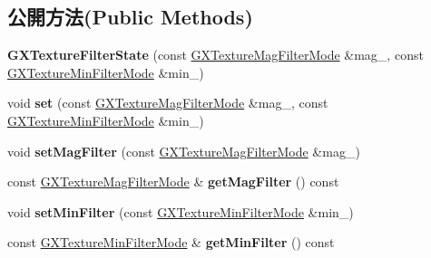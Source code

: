 \subsection*{公開方法(Public Methods)}
\begin{DoxyCompactItemize}
\item 
{\bfseries G\+X\+Texture\+Filter\+State} (const \hyperlink{class_i_dream_sky_1_1_g_x_texture_mag_filter_mode}{G\+X\+Texture\+Mag\+Filter\+Mode} \&mag\+\_\+, const \hyperlink{class_i_dream_sky_1_1_g_x_texture_min_filter_mode}{G\+X\+Texture\+Min\+Filter\+Mode} \&min\+\_\+)\hypertarget{class_i_dream_sky_1_1_g_x_texture_filter_state_a4638bdd3fe6d2c959250e1834852b9d8}{}\label{class_i_dream_sky_1_1_g_x_texture_filter_state_a4638bdd3fe6d2c959250e1834852b9d8}

\item 
void {\bfseries set} (const \hyperlink{class_i_dream_sky_1_1_g_x_texture_mag_filter_mode}{G\+X\+Texture\+Mag\+Filter\+Mode} \&mag\+\_\+, const \hyperlink{class_i_dream_sky_1_1_g_x_texture_min_filter_mode}{G\+X\+Texture\+Min\+Filter\+Mode} \&min\+\_\+)\hypertarget{class_i_dream_sky_1_1_g_x_texture_filter_state_ab67ff8c05946d40a80aa4cd3330c3d5d}{}\label{class_i_dream_sky_1_1_g_x_texture_filter_state_ab67ff8c05946d40a80aa4cd3330c3d5d}

\item 
void {\bfseries set\+Mag\+Filter} (const \hyperlink{class_i_dream_sky_1_1_g_x_texture_mag_filter_mode}{G\+X\+Texture\+Mag\+Filter\+Mode} \&mag\+\_\+)\hypertarget{class_i_dream_sky_1_1_g_x_texture_filter_state_a04fc4a2c39df862db34f16d89bfa2120}{}\label{class_i_dream_sky_1_1_g_x_texture_filter_state_a04fc4a2c39df862db34f16d89bfa2120}

\item 
const \hyperlink{class_i_dream_sky_1_1_g_x_texture_mag_filter_mode}{G\+X\+Texture\+Mag\+Filter\+Mode} \& {\bfseries get\+Mag\+Filter} () const \hypertarget{class_i_dream_sky_1_1_g_x_texture_filter_state_a55894ddfe4b22c05f395c166920839ac}{}\label{class_i_dream_sky_1_1_g_x_texture_filter_state_a55894ddfe4b22c05f395c166920839ac}

\item 
void {\bfseries set\+Min\+Filter} (const \hyperlink{class_i_dream_sky_1_1_g_x_texture_min_filter_mode}{G\+X\+Texture\+Min\+Filter\+Mode} \&min\+\_\+)\hypertarget{class_i_dream_sky_1_1_g_x_texture_filter_state_a7b829e8c55805f4186e7496cdafc5040}{}\label{class_i_dream_sky_1_1_g_x_texture_filter_state_a7b829e8c55805f4186e7496cdafc5040}

\item 
const \hyperlink{class_i_dream_sky_1_1_g_x_texture_min_filter_mode}{G\+X\+Texture\+Min\+Filter\+Mode} \& {\bfseries get\+Min\+Filter} () const \hypertarget{class_i_dream_sky_1_1_g_x_texture_filter_state_a61d7ac8beb0d7bac98fe277b979b04de}{}\label{class_i_dream_sky_1_1_g_x_texture_filter_state_a61d7ac8beb0d7bac98fe277b979b04de}

\end{DoxyCompactItemize}


